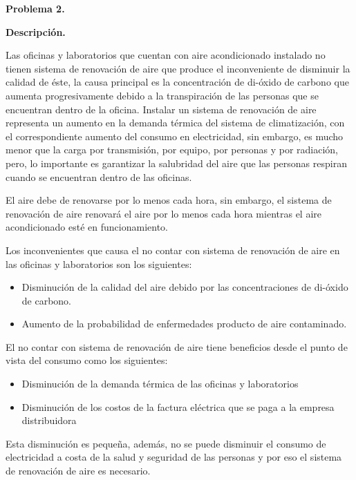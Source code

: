 \documentclass[12pt,letterpaper]{report}
\begin{document}
\textbf{Problema 2.}

\textbf{Descripción.}

Las oficinas y laboratorios que cuentan con aire acondicionado instalado no tienen sistema de renovación de aire que produce el inconveniente de disminuir la calidad de éste, la causa principal es la concentración de di-óxido de carbono que aumenta progresivamente debido a la transpiración de las personas que se encuentran dentro de la oficina. Instalar un sistema de renovación de aire representa un aumento en la demanda térmica del sistema de climatización, con el correspondiente aumento del consumo en electricidad, sin embargo, es mucho menor que la carga por transmisión, por equipo, por personas y por radiación, pero, lo importante es garantizar la salubridad del aire que las personas respiran cuando se encuentran dentro de las oficinas.

El aire debe de renovarse por lo menos cada hora, sin embargo, el sistema de renovación de aire renovará el aire por lo menos cada hora mientras el aire acondicionado esté en funcionamiento.

Los inconvenientes que causa el no contar con sistema de renovación de aire en las oficinas y laboratorios son los siguientes:

\begin{itemize}

 \item Disminución de la calidad del aire debido por las concentraciones de di-óxido de carbono.
	 \item Aumento de la probabilidad de enfermedades producto de aire contaminado.

\end{itemize}

El no contar con sistema de renovación de aire tiene beneficios desde el punto de vista del consumo como los siguientes:

\begin{itemize}

  \item Disminución de la demanda térmica de las oficinas y laboratorios
  \item Disminución de los costos de la factura eléctrica que se paga a la empresa distribuidora

\end{itemize}

Esta disminución es pequeña, además, no se puede disminuir el consumo de electricidad a costa de la salud y seguridad de las personas y por eso el sistema de renovación de aire es necesario.
\end{document}
